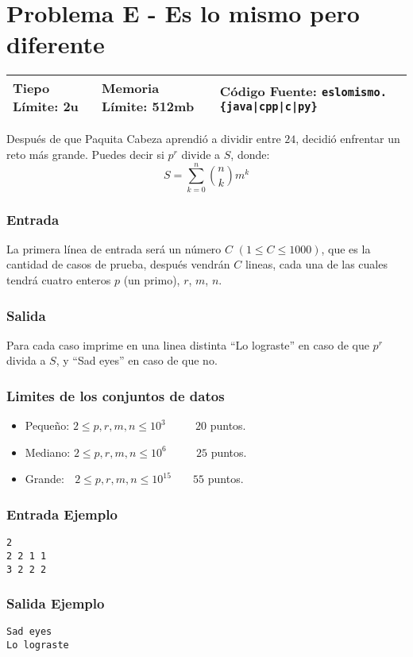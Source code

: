 \chapter*{Problema E - Es lo mismo pero diferente}

\begin{center}
  \begin{tabular}{ | l | l | l | }
    \hline
    Tiepo Límite: 2u & Memoria Límite: 512mb & Código Fuente: \texttt{eslomismo.\{java|cpp|c|py\}} \\
    \hline
  \end{tabular}
\end{center}

Después de que Paquita Cabeza aprendió a dividir entre $24$, decidió enfrentar un reto más grande. Puedes decir si $p^r$ divide a $S$, donde:
$$S=\sum_{k=0}^n \binom{n}{k}m^k$$

\subsection*{Entrada}

La primera línea de entrada será un número $C$ $(1 \leq  C\leq 1000)$, que es la cantidad de casos de prueba, después vendrán $C$ lineas, cada una de las cuales tendrá cuatro enteros $p$ (un primo), $r$, $m$, $n$.

\subsection*{Salida}
Para cada caso imprime en una linea distinta ``Lo lograste'' en caso de que $p^r$ divida a $S$, y ``Sad eyes'' en caso de que no.

\subsection*{Limites de los conjuntos de datos}
\begin{itemize}
    \item Pequeño: $ 2\leq p, r, m, n \leq 10^3 $ $\quad \quad $ $20$ puntos.
    \item Mediano: $ 2\leq p, r, m, n \leq 10^6 $ $\quad \quad$ $25$ puntos.
    \item Grande: $\,\;\, 2\leq p, r, m, n \leq 10^{15} $ $\quad \;$ $55$ puntos.
\end{itemize}

\begin{multicols}{2}
\subsection*{Entrada Ejemplo}
\begin{verbatim}
2
2 2 1 1
3 2 2 2 
\end{verbatim}
\columnbreak
\subsection*{Salida Ejemplo}
\begin{verbatim}
Sad eyes
Lo lograste
\end{verbatim}
\end{multicols}

